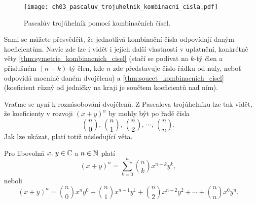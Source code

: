 \begin{figure}[H]
    \centering
    \texttt{[image: ch03\_pascaluv\_trojuhelnik\_kombinacni\_cisla.pdf]}
    \caption{Pascalův trojúhelník pomocí kombinačních čísel.}
    \label{fig:pascaluv_trojuhelnik_kombinacni_cisla}
\end{figure}
Sami se můžete přesvědčit, že jednotlivá kombinační čísla odpovídají daným koeficientům. Navíc zde lze i vidět i jejich další vlastnosti v uplatnění, konkrétně věty \ref{thm:symetrie_kombinacnich_cisel} (stačí se podívat na $k$-tý člen a příslušném $(n-k)$-tý člen, kde $n$ zde představuje číslo řádku od nuly, neboť odpovídá mocnině daném dvojčlenu) a \ref{thm:soucet_kombinacnich_cisel} (koeficient různý od jedničky na kraji je součtem koeficientů nad ním).\par

Vraťme se nyní k roznásobování dvojčlenů. Z Pascalova trojúhelníku lze tak vidět, že koeficienty v rozvoji $(x+y)^n$ by mohly být po řadě čísla
\[\binom{n}{0},\,\binom{n}{1},\,\binom{n}{2},\,\cdots,\,\binom{n}{n}.\]
Jak lze ukázat, platí totiž následující věta.
\begin{theorem}[Binomická]
    Pro libovolná $x,\,y\in\mathbb{C}$ a $n\in\mathbb{N}$ platí
    \[(x+y)^n=\sum_{k=0}^{n}\binom{n}{k}x^{n-k}y^k,\]
    neboli
    \[(x+y)^n=\binom{n}{0}x^ny^0+\binom{n}{1}x^{n-1}y^1+\binom{n}{2}x^{n-2}y^2+\cdots+\binom{n}{n}x^0y^n.\]
\end{theorem}